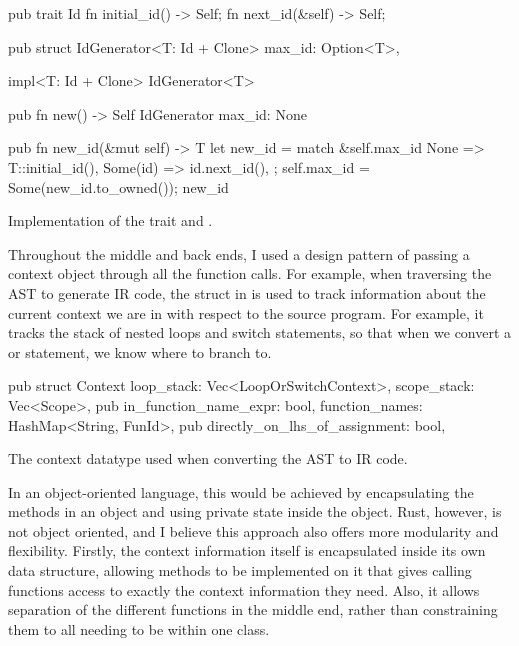 \documentclass[00-main.tex]{subfiles}
\begin{document}
\begin{listing}[!ht]
  \begin{RustListing}
    pub trait Id {
        fn initial_id() -> Self;
        fn next_id(&self) -> Self;
    }

    pub struct IdGenerator<T: Id + Clone> {
        max_id: Option<T>,
    }

    impl<T: Id + Clone> IdGenerator<T> {
        pub fn new() -> Self {
            IdGenerator { max_id: None }
        }

        pub fn new_id(&mut self) -> T {
            let new_id = match &self.max_id {
                None => T::initial_id(),
                Some(id) => id.next_id(),
            };
            self.max_id = Some(new_id.to_owned());
            new_id
        }
    }
  \end{RustListing}
  \caption{Implementation of the  trait and .}
  \label{lst:Id and IdGenerator implementation}
\end{listing}

Throughout the middle and back ends, I used a design pattern of passing a context object through all the function calls.
For example, when traversing the AST to generate IR code, the  struct in  is used to track information about the current context we are in with respect to the source program.
For example, it tracks the stack of nested loops and switch statements, so that when we convert a  or  statement, we know where to branch to.

\begin{listing}[!ht]
  \begin{RustListing}
    pub struct Context {
        loop_stack: Vec<LoopOrSwitchContext>,
        scope_stack: Vec<Scope>,
        pub in_function_name_expr: bool,
        function_names: HashMap<String, FunId>,
        pub directly_on_lhs_of_assignment: bool,
    }
  \end{RustListing}
  \caption{The context datatype used when converting the AST to IR code.}
  \label{lst:AST to IR context struct}
\end{listing}

In an object-oriented language, this would be achieved by encapsulating the methods in an object and using private state inside the object.
Rust, however, is not object oriented, and I believe this approach also offers more modularity and flexibility.
Firstly, the context information itself is encapsulated inside its own data structure, allowing methods to be implemented on it that gives calling functions access to exactly the context information they need.
Also, it allows separation of the different functions in the middle end, rather than constraining them to all needing to be within one class.
\end{document}
